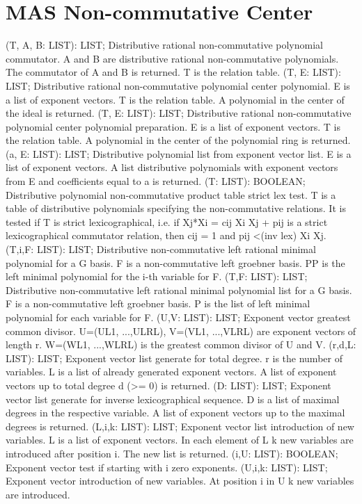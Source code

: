 \section{ MAS Non-commutative Center  } 
 (T, A, B: LIST): LIST; \eproc
\bcom Distributive rational non-commutative polynomial commutator.
A and B are distributive rational non-commutative polynomials.
The commutator of A and B is returned. T is the relation table.  \ecom 
{} (T, E: LIST): LIST; \eproc
\bcom Distributive rational non-commutative polynomial center polynomial.
E is a list of exponent vectors. T is the relation table. 
A polynomial in the center of the ideal 
is returned.  \ecom 
{} (T, E: LIST): LIST; \eproc
\bcom Distributive rational non-commutative polynomial center polynomial preparation.
E is a list of exponent vectors. T is the relation table. 
A polynomial in the center of the polynomial ring is returned.  \ecom 
{} (a, E: LIST): LIST; \eproc
\bcom Distributive polynomial list from exponent vector list.
E is a list of exponent vectors. A list distributive polynomials with 
exponent vectors from E and coefficients equal to a is returned.  \ecom 
{} (T: LIST): BOOLEAN; \eproc
\bcom Distributive polynomial non-commutative product table strict lex test.
T is a table of distributive polynomials specifying the non-commutative
relations. It is tested if T is strict lexicographical, i.e. if 
Xj*Xi = cij Xi Xj + pij is a strict lexicographical commutator relation,
then cij = 1 and pij <(inv lex) Xi Xj.  \ecom 
{} (T,i,F: LIST): LIST; \eproc
\bcom Distributive non-commutative left rational minimal polynomial for a G basis.
F is a non-commutative left groebner basis. 
PP is the left minimal polynomial for the i-th variable for F.  \ecom 
{} (T,F: LIST): LIST; \eproc
\bcom Distributive non-commutative left rational minimal polynomial list for a G basis.
F is a non-commutative left groebner basis. 
P is the list of left minimal polynomial for each variable for F.  \ecom 
{} (U,V: LIST): LIST; \eproc
\bcom Exponent vector greatest common divisor. U=(UL1, ...,ULRL),
V=(VL1, ...,VLRL) are exponent vectors of length r.
W=(WL1, ...,WLRL) is the greatest common divisor of U and V.  \ecom 
{} (r,d,L: LIST): LIST; \eproc
\bcom Exponent vector list generate for total degree.
r is the number of variables. L is a list of already generated 
exponent vectors. A list of exponent vectors up to total degree 
d (>= 0) is returned.  \ecom 
{} (D: LIST): LIST; \eproc
\bcom Exponent vector list generate for inverse lexicographical sequence.
D is a list of maximal degrees in the respective variable. 
A list of exponent vectors up to the maximal degrees is returned.  \ecom 
{} (L,i,k: LIST): LIST; \eproc
\bcom Exponent vector list introduction of new variables.
L is a list of exponent vectors. In each element of L k new variables
are introduced after position i. The new list is returned.  \ecom 
{} (i,U: LIST): BOOLEAN; \eproc
\bcom Exponent vector test if starting with i zero exponents.  \ecom 
{} (U,i,k: LIST): LIST; \eproc
\bcom Exponent vector introduction of new variables. At position
i in U k new variables are introduced.  \ecom 
